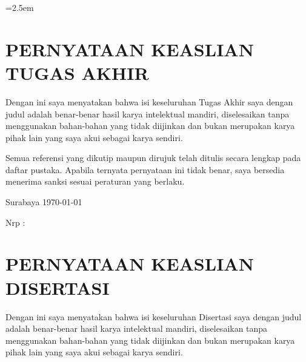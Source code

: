 \normalsize
{}
\singlespacing
\emergencystretch=2.5em

\cleardoublepage

\cleardoublepage

{
	{
\chapter*{PERNYATAAN KEASLIAN TUGAS AKHIR}


\begin{spacing}{1.5}
	
	Dengan ini saya menyatakan bahwa isi keseluruhan Tugas Akhir saya dengan judul \textbf{\JdTesis} adalah benar-benar hasil karya intelektual mandiri, diselesaikan tanpa menggunakan bahan-bahan yang tidak diijinkan dan bukan merupakan karya pihak lain yang saya akui sebagai karya sendiri.
	
	Semua referensi yang dikutip maupun dirujuk telah ditulis secara lengkap pada daftar pustaka. Apabila ternyata pernyataan ini tidak benar, saya bersedia menerima sanksi sesuai peraturan yang berlaku.
	
	\hspace{30ex}Surabaya \today
	
	\vspace{10ex}
	
	\hspace{35ex}\underline{\NamaMahasiswa}
	
	\hspace{35ex}Nrp :\NrpMahasiswa
	
\end{spacing}
\cleardoublepage

}
{
	
	\chapter*{PERNYATAAN KEASLIAN DISERTASI}
	
	\begin{spacing}{1.5}
		
		Dengan ini saya menyatakan bahwa isi keseluruhan Disertasi  saya dengan judul \textbf{\JdTesis} adalah benar-benar hasil karya intelektual mandiri, diselesaikan tanpa menggunakan bahan-bahan yang tidak diijinkan dan bukan merupakan karya pihak lain yang saya akui sebagai karya sendiri.
	

\end{spacing}}}

